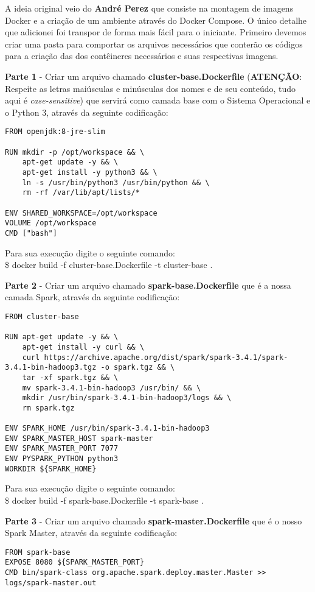 A ideia original veio do \textbf{André Perez} que consiste na montagem de imagens Docker e a criação de um ambiente através do Docker Compose. O único detalhe que adicionei foi transpor de forma mais fácil para o iniciante. Primeiro devemos criar uma pasta para comportar os arquivos necessários que conterão os códigos para a criação das dos contêineres necessários e suas respectivas imagens.

\textbf{Parte 1} - Criar um arquivo chamado \textbf{cluster-base.Dockerfile} (\textbf{ATENÇÃO}: Respeite as letras maiúsculas e minúsculas dos nomes e de seu conteúdo, tudo aqui é \textit{case-sensitive}) que servirá como camada base com o Sistema Operacional e o Python 3, através da seguinte codificação:
\begin{lstlisting}[]
FROM openjdk:8-jre-slim

RUN mkdir -p /opt/workspace && \
    apt-get update -y && \
    apt-get install -y python3 && \
    ln -s /usr/bin/python3 /usr/bin/python && \
    rm -rf /var/lib/apt/lists/*

ENV SHARED_WORKSPACE=/opt/workspace
VOLUME /opt/workspace
CMD ["bash"]
\end{lstlisting}

Para sua execução digite o seguinte comando: \\
{\ttfamily\$ docker build -f cluster-base.Dockerfile -t cluster-base .}

\textbf{Parte 2} - Criar um arquivo chamado \textbf{spark-base.Dockerfile} que é a nossa camada Spark, através da seguinte codificação:
\begin{lstlisting}[]
FROM cluster-base

RUN apt-get update -y && \
    apt-get install -y curl && \
    curl https://archive.apache.org/dist/spark/spark-3.4.1/spark-3.4.1-bin-hadoop3.tgz -o spark.tgz && \
    tar -xf spark.tgz && \
    mv spark-3.4.1-bin-hadoop3 /usr/bin/ && \
    mkdir /usr/bin/spark-3.4.1-bin-hadoop3/logs && \
    rm spark.tgz

ENV SPARK_HOME /usr/bin/spark-3.4.1-bin-hadoop3
ENV SPARK_MASTER_HOST spark-master
ENV SPARK_MASTER_PORT 7077
ENV PYSPARK_PYTHON python3
WORKDIR ${SPARK_HOME}
\end{lstlisting}

Para sua execução digite o seguinte comando: \\
{\ttfamily\$ docker build -f spark-base.Dockerfile -t spark-base .}
 
\textbf{Parte 3} - Criar um arquivo chamado \textbf{spark-master.Dockerfile} que é o nosso Spark Master, através da seguinte codificação:
\begin{lstlisting}[]
FROM spark-base
EXPOSE 8080 ${SPARK_MASTER_PORT}
CMD bin/spark-class org.apache.spark.deploy.master.Master >> logs/spark-master.out
\end{lstlisting}

